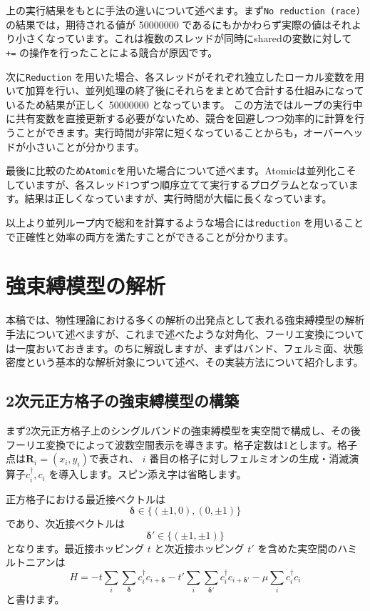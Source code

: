 \documentclass[12pt]{jreport}
\begin{document}
上の実行結果をもとに手法の違いについて述べます。まず\texttt{No reduction (race)} の結果では，期待される値が 50000000 であるにもかかわらず実際の値はそれより小さくなっています。これは複数のスレッドが同時にsharedの変数に対して
\texttt{+=} の操作を行ったことによる競合が原因です。

次に\texttt{Reduction} を用いた場合、各スレッドがそれぞれ独立したローカル変数を用いて加算を行い、並列処理の終了後にそれらをまとめて合計する仕組みになっているため結果が正しく 50000000 となっています。
この方法ではループの実行中に共有変数を直接更新する必要がないため、競合を回避しつつ効率的に計算を行うことができます。実行時間が非常に短くなっていることからも，オーバーヘッドが小さいことが分かります。

最後に比較のため\texttt{Atomic}を用いた場合について述べます。Atomicは並列化こそしていますが、各スレッド1つずつ順序立てて実行するプログラムとなっています。結果は正しくなっていますが、実行時間が大幅に長くなっています。

以上より並列ループ内で総和を計算するような場合には\texttt{reduction} を用いることで正確性と効率の両方を満たすことができることが分かります。

\chapter{強束縛模型の解析}
本稿では、物性理論における多くの解析の出発点として表れる強束縛模型の解析手法について述べますが、これまで述べたような対角化、フーリエ変換については一度おいておきます。のちに解説しますが、まずはバンド、フェルミ面、状態密度という基本的な解析対象について述べ、その実装方法について紹介します。
\section{2次元正方格子の強束縛模型の構築}
まず2次元正方格子上のシングルバンドの強束縛模型を実空間で構成し、その後フーリエ変換でによって波数空間表示を導きます。格子定数は1とします。格子点は$\bm{R}_i = (x_i, y_i)$で表され、 $i$ 番目の格子に対しフェルミオンの生成・消滅演算子$c_i^\dagger, c_i$ を導入します。スピン添え字は省略します。

正方格子における最近接ベクトルは
\begin{equation}
\bm{\delta} \in \{(\pm1,0),(0,\pm1)\}
\end{equation}
であり、次近接ベクトルは
\begin{equation}
\bm{\delta}' \in \{(\pm1,\pm1)\}
\end{equation}
となります。最近接ホッピング $t$ と次近接ホッピング $t'$ を含めた実空間のハミルトニアンは
\begin{equation}
H
=
- t \sum_i \sum_{\bm{\delta}}
c_i^\dagger c_{i+\bm{\delta}}
- t' \sum_i \sum_{\bm{\delta}'}
c_i^\dagger c_{i+\bm{\delta}'}
- \mu \sum_i c_i^\dagger c_i
\end{equation}
と書けます。
\end{document}
